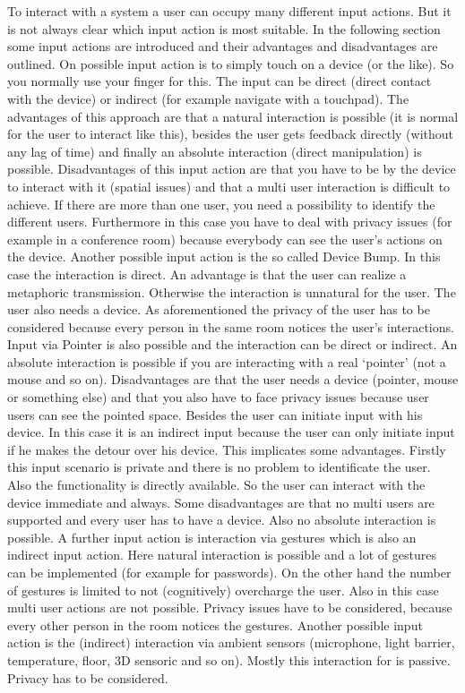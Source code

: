 \documentclass{acm_proc_article-sp}
\begin{document}
To interact with a system a user can occupy many different input actions. But it is not always clear which input action is most suitable. In the following section some input actions are introduced and their advantages and disadvantages are outlined.
On possible input action is to simply touch on a device (or the like). So you normally use your finger for this. The input can be direct (direct contact with the device) or indirect (for example navigate with a touchpad). The advantages of this approach are that a natural interaction is possible (it is normal for the user to interact like this), besides the user gets feedback directly (without any lag of time) and finally an absolute interaction (direct manipulation) is possible. Disadvantages of this input action are that you have to be by the device to interact with it (spatial issues) and that a multi user interaction is difficult to achieve. If there are more than one user, you need a possibility to identify the different users. Furthermore in this case you have to deal with privacy issues (for example in a conference room) because everybody can see the user’s actions on the device.
Another possible input action is the so called Device Bump. In this case the interaction is direct. An advantage is that the user can realize a metaphoric transmission. Otherwise the interaction is unnatural for the user. The user also needs a device. As aforementioned the privacy of the user has to be considered because every person in the same room notices the user’s interactions. 
Input via Pointer is also possible and the interaction can be direct or indirect. An absolute interaction is possible if you are interacting with a real ‘pointer’ (not a mouse and so on). Disadvantages are that the user needs a device (pointer, mouse or something else) and that you also have to face privacy issues because user users can see the pointed space.
Besides the user can initiate input with his device. In this case it is an indirect input because the user can only initiate input if he makes the detour over his device. This implicates some advantages. Firstly this input scenario is private and there is no problem to identificate the user. Also the functionality is directly available. So the user can interact with the device immediate and always. Some disadvantages are that no multi users are supported and every user has to have a device. Also no absolute interaction is possible.
A further input action is interaction via gestures which is also an indirect input action. Here natural interaction is possible and a lot of gestures can be implemented (for example for passwords). On the other hand the number of gestures is limited to not (cognitively) overcharge the user. Also in this case multi user actions are not possible. Privacy issues have to be considered, because every other person in the room notices the gestures.
Another possible input action is the (indirect) interaction via ambient sensors (microphone, light barrier, temperature, floor, 3D sensoric and so on). Mostly this interaction for is passive. Privacy has to be considered.
\end{document}
